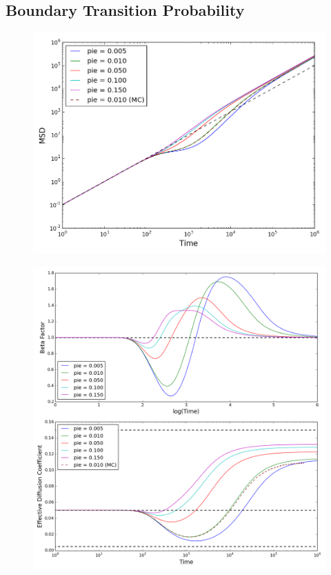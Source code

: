 \clearpage
\subsection{Boundary Transition Probability}
\label{sec:2D-boundary-transition-probability}

	\begin{figure}[h]
		\centering
		\includegraphics[width=1.0\linewidth]{../images/2D/pie_msd_2D}
		\caption{}
		\label{fig:pie_msd_2D}
	\end{figure}
	
	\begin{figure}[h]
		\centering
		\includegraphics[width=1.0\linewidth]{../images/2D/pie_beta_deff_2D}
		\caption{}
		\label{fig:pie_beta_deff_2D}
	\end{figure}

